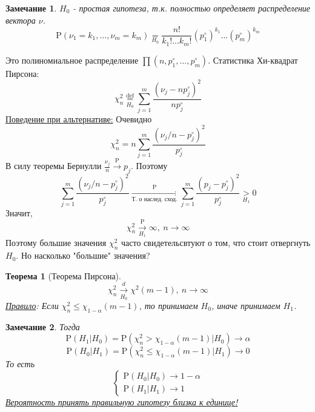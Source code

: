 \documentclass[12pt]{article}
\newtheorem*{remark*}{Замечание}
\theoremstyle{basic_theorem}
\theoremstyle{name_theorem}
\newtheorem*{named_theorem}{Теорема}
\newcommand*{\defeq}{\stackrel{\text{def}}{=}}
\def\P{ \mathrm{P} }
\begin{document}
\begin{remark*}
    $H_0$ - простая гипотеза, т.к. полностью определяет распределение
    вектора $\nu$.
    \[ \P(\nu_1=k_1,\ldots,\nu_m=k_m)\underset{H_0}{=}\frac{n!}{k_1!\ldots k_m!}(p_1^\circ)^{k_1}\ldots(p_m^\circ)^{k_m}\]
\end{remark*}
Это полиномиальное распределение $\prod(n,p_1^\circ, \ldots, p_m^\circ)$.
Статистика Хи-квадрат Пирсона:
\[\chi_n^2\underset{H_0}{\defeq}\sum_{j=1}^m\frac{(\nu_j-np_j^\circ)^2}{np_j^\circ}\]
\underline{Поведение при альтернативе:} Очевидно
\[\chi_n^2=n\sum_{j=1}^m\frac{(\nu_j/n-p_j^\circ)^2}{p_j^\circ}\]
В силу теоремы Бернулли $\frac{\nu_j}{n}\xrightarrow{\P}p_j$.
Поэтому
\[\sum_{j=1}^m\frac{(\nu_j/n-p_j^\circ)^2}{p_j^\circ}\xrightarrow[\text{Т. о наслед. сход.}]{\P}\sum_{j=1}^m\frac{(p_j-p_j^\circ)^2}{p_j^\circ}\underset{H_1}{>}0\]
Значит,
\[\chi_n^2\xrightarrow[H_1]{\P}\infty,\ n\rightarrow\infty\]
Поэтому большие значения $\chi_n^2$ часто свидетельсвтуют о том, что
стоит отвергнуть $H_0$. Но насколько "большие" значения?
\begin{named_theorem}[Теорема Пирсона]
    \[ \chi_n^2\xrightarrow[H_0]{d}\chi^2(m-1),\ n\rightarrow\infty \]
    \underline{Правило}: Если $\chi_n^2\leq\chi_{1-\alpha}(m-1)$, то принимаем $H_0$,
    иначе принимаем $H_1$.
\end{named_theorem}
\begin{remark*} Тогда
    \[\P(H_1\vert H_0)=\P(\chi^2_n>\chi_{1-\alpha}(m-1)\vert H_0)\rightarrow\alpha\]
    \[\P(H_0\vert H_1)=\P(\chi^2_n\leq\chi_{1-\alpha}(m-1)\vert H_1)\rightarrow0\]
    То есть
    \[\begin{cases}
        \P(H_0\vert H_0)\rightarrow1-\alpha \\
        \P(H_1\vert H_1)\rightarrow1
    \end{cases}\]
    \underline{Вероятность принять правильную гипотезу близка к единице!}
\end{remark*}
\end{document}

